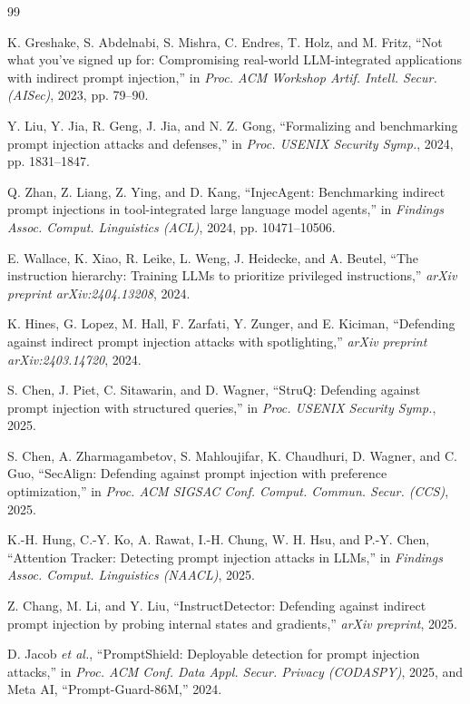 \documentclass[conference]{IEEEtran}
\begin{document}
\begin{thebibliography}{99}

 K. Greshake, S. Abdelnabi, S. Mishra, C. Endres, T. Holz, and M. Fritz, ``Not what you've signed up for: Compromising real-world LLM-integrated applications with indirect prompt injection,'' in \emph{Proc. ACM Workshop Artif. Intell. Secur. (AISec)}, 2023, pp. 79--90.

 Y. Liu, Y. Jia, R. Geng, J. Jia, and N. Z. Gong, ``Formalizing and benchmarking prompt injection attacks and defenses,'' in \emph{Proc. USENIX Security Symp.}, 2024, pp. 1831--1847.

 Q. Zhan, Z. Liang, Z. Ying, and D. Kang, ``InjecAgent: Benchmarking indirect prompt injections in tool-integrated large language model agents,'' in \emph{Findings Assoc. Comput. Linguistics (ACL)}, 2024, pp. 10471--10506.

 E. Wallace, K. Xiao, R. Leike, L. Weng, J. Heidecke, and A. Beutel, ``The instruction hierarchy: Training LLMs to prioritize privileged instructions,'' \emph{arXiv preprint arXiv:2404.13208}, 2024.

 K. Hines, G. Lopez, M. Hall, F. Zarfati, Y. Zunger, and E. Kiciman, ``Defending against indirect prompt injection attacks with spotlighting,'' \emph{arXiv preprint arXiv:2403.14720}, 2024.

 S. Chen, J. Piet, C. Sitawarin, and D. Wagner, ``StruQ: Defending against prompt injection with structured queries,'' in \emph{Proc. USENIX Security Symp.}, 2025.

 S. Chen, A. Zharmagambetov, S. Mahloujifar, K. Chaudhuri, D. Wagner, and C. Guo, ``SecAlign: Defending against prompt injection with preference optimization,'' in \emph{Proc. ACM SIGSAC Conf. Comput. Commun. Secur. (CCS)}, 2025.

 K.-H. Hung, C.-Y. Ko, A. Rawat, I.-H. Chung, W. H. Hsu, and P.-Y. Chen, ``Attention Tracker: Detecting prompt injection attacks in LLMs,'' in \emph{Findings Assoc. Comput. Linguistics (NAACL)}, 2025.

 Z. Chang, M. Li, and Y. Liu, ``InstructDetector: Defending against indirect prompt injection by probing internal states and gradients,'' \emph{arXiv preprint}, 2025.

 D. Jacob \emph{et al.}, ``PromptShield: Deployable detection for prompt injection attacks,'' in \emph{Proc. ACM Conf. Data Appl. Secur. Privacy (CODASPY)}, 2025, and Meta AI, ``Prompt-Guard-86M,'' 2024.


\end{thebibliography}
\end{document}

